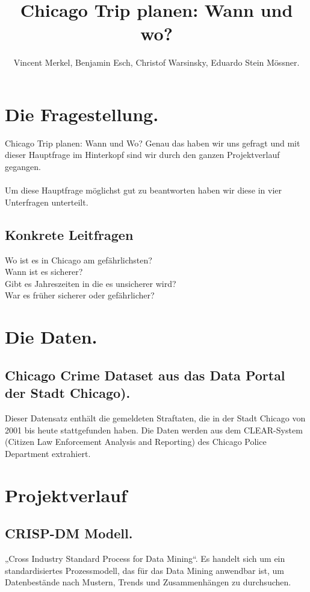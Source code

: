 \documentclass[a4paper,12pt]{article}
\title{Chicago Trip planen: Wann und wo?}
\author{Vincent Merkel, Benjamin Esch, Christof Warsinsky, Eduardo Stein Mössner.}
\begin{document}
\maketitle
\tableofcontents

\section{Die Fragestellung.}
Chicago Trip planen: Wann und Wo? Genau das haben wir uns gefragt und mit dieser Hauptfrage im Hinterkopf sind wir durch den ganzen Projektverlauf gegangen.\\
\\
Um diese Hauptfrage möglichst gut zu beantworten haben wir diese in vier Unterfragen unterteilt.

\subsection{Konkrete Leitfragen}
Wo ist es in Chicago am gefährlichsten?
\\Wann ist es sicherer?
\\Gibt es Jahreszeiten in die es unsicherer wird?
\\War es früher sicherer oder gefährlicher?

\section{Die Daten.}

\subsection{Chicago Crime Dataset aus das Data Portal der Stadt Chicago).}
Dieser Datensatz enthält die gemeldeten Straftaten, die in der Stadt Chicago von 2001 bis heute stattgefunden haben. Die Daten werden aus dem CLEAR-System (Citizen Law Enforcement Analysis and Reporting) des Chicago Police Department extrahiert.

\section{Projektverlauf}

\subsection{CRISP-DM Modell.}
„Cross Industry Standard Process for Data Mining“. Es handelt sich um ein standardisiertes Prozessmodell, das für das Data Mining anwendbar ist, um Datenbestände nach Mustern, Trends und Zusammenhängen zu durchsuchen.\\
\\
\cite{https://www.bigdata-insider.de/}
\end{document}
